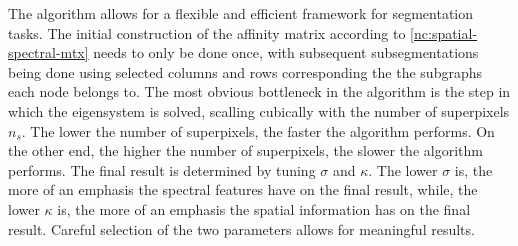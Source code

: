The algorithm allows for a flexible and efficient framework for segmentation tasks. The initial construction of the affinity matrix according to \eqref{nc:spatial-spectral-mtx} needs to only be done once, with subsequent subsegmentations being done using selected columns and rows corresponding the the subgraphs each node belongs to. The most obvious bottleneck in the algorithm is the step in which the eigensystem is solved, scalling cubically with the number of superpixels $n_s$. The lower the number of superpixels, the faster the algorithm performs. On the other end, the higher the number of superpixels, the slower the algorithm performs. The final result is determined by tuning $\sigma$ and $\kappa$. The lower $\sigma$ is, the more of an emphasis the spectral features have on the final result, while, the lower $\kappa$ is, the more of an emphasis the spatial information has on the final result. Careful selection of the two parameters allows for meaningful results.
